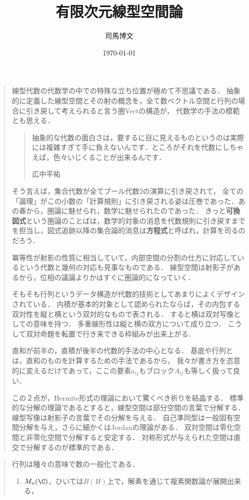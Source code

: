 \documentclass[uplatex, dvipdfmx]{jsreport}
\title{有限次元線型空間論}
\author{司馬博文}
\date{\today}
\begin{document}
\tableofcontents

\begin{quotation}
    線型代数の代数学の中での特殊な立ち位置が極めて不思議である．
    抽象的に定義した線型空間とその射の概念を，全て数ベクトル空間と行列の場合に引き戻して考えられると言う圏Vectの構造が，
    代数学の手法の模範とも思える．
    \begin{quote}
        抽象的な代数の面白さは，要するに目に見えるものというのは実際には複雑すぎて手に負えないんです．ところがそれを代数にしちゃえば，色々いじくることが出来るんです．
        \begin{flushright}
            広中平祐
        \end{flushright}
    \end{quote}
    そう言えば，集合代数が全てブール代数$2$の演算に引き戻されて，
    全ての「論理」がこの小数の「計算規則」に引き戻される姿は圧巻であった．あの春から，圏論に魅せられ，数学に魅せられたのであった．
    きっと\textbf{可換図式}という圏論のことばは，数学的対象の消息を代数規則に引き戻すまでを担当し，図式追跡以降の集合論的消息は\textbf{方程式}と呼ばれ，計算を司るのだろう．

    冪等性が射影の性質に相当していて，内部空間の分割の仕方に対応しているという代数と幾何の対応も見事なものである．
    線型空間は射影子があるから，位相の議論よりかはすぐに圏論的になっていく．

    そもそも行列というデータ構造が代数的技術としてあまりによくデザインされている．
    内積が基本的対象として認められたならば，その内包する双対性を縦と横という双対的なもので表される．
    すると横は双対写像としての意味を持つ．
    多重線形性は縦と横の双方について成り立つ．
    こうして双対命題を転置で行き来できる枠組みが出来上がる．

    直和が前半の，直積が後半の代数的手法の中心となる．
    基底や行列とは，直和のものを計算するための手法であるから，
    我々が書き方を恣意的に変えるだけであって，ここの要素$a_{ij}$もブロック$A_{ij}$も等しく扱って良い．

    この２点が，Hermite形式の理論において驚くべき祈りを結晶する．
    標準的な分解の理論であるとすると，線型空間は部分空間の言葉で分解する．
    線型写像は射影子の言葉でその分解を与える．
    自己準同型は一般固有空間分解を与え，さらに細かくはJordanの理論がある．
    双対空間は零化空間と非零化空間で分解すると安定する．
    対称形式が与えられた空間は直交で分解するのが標準的である．
\end{quotation}

\begin{quotation}
    行列は種々の意味で数の一般化である．
    \begin{enumerate}
        \item $M_n(\C)$，ひいては$B(H)$上で，解素を通じて複素関数論が展開出来る，
    \end{enumerate}
\end{quotation}
\end{document}
